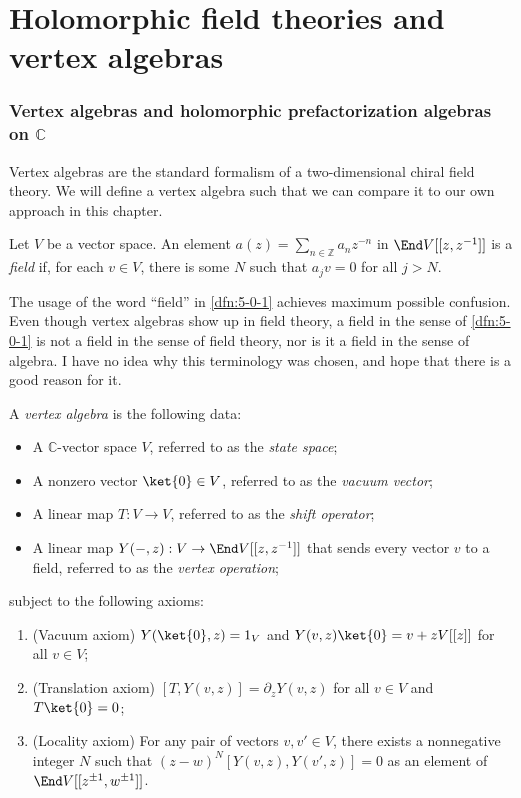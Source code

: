 \chapter{Holomorphic field theories and vertex algebras}


\subsection{Vertex algebras and holomorphic prefactorization algebras on $\mathbb{C} $}

Vertex algebras are the standard formalism of a two-dimensional chiral field theory. We will define a vertex algebra such that we can compare it to our own approach in this chapter.

\begin{definition}\label{dfn:5-0-1}
	Let $V$ be a vector space. An element $a(z) = \sum_{n\in\mathbb{Z} } a_nz^{-n} $ in $\End V[[z,z^{-1} ]]$ is a \emph{field} if, for each $v\in V$, there is some $N$ such that $a_jv=0$ for all $j>N$.
\end{definition}
\begin{warning}\label{warn:5-0-2}
	The usage of the word ``field'' in \cref{dfn:5-0-1} achieves maximum possible confusion. Even though vertex algebras show up in field theory, a field in the sense of \cref{dfn:5-0-1} is not a field in the sense of field theory, nor is it a field in the sense of algebra. I have no idea why this terminology was chosen, and hope that there is a good reason for it.
\end{warning}

\begin{definition}\label{dfn:5-0-3}
	A \emph{vertex algebra} is the following data:
	\begin{itemize}
		\item A $\mathbb{C} $-vector space $V$, referred to as the \emph{state space};
		\item A nonzero vector $\ket{0}\in V$, referred to as the \emph{vacuum vector};
		\item A linear map $T : V \to V$, referred to as the \emph{shift operator};
		\item A linear map $Y(-,z): V \to \End V[[z,z^{-1} ]]$ that sends every vector $v$ to a field, referred to as the \emph{vertex operation};
	\end{itemize}
	subject to the following axioms:
	\begin{enumerate}
		\item (Vacuum axiom) $Y(\ket{0},z)=1_V$ and $Y(v,z)\ket{0}=v+zV[[z]]$ for all $v\in V$;
		\item (Translation axiom) $[T,Y(v,z)] = \partial _zY(v,z)$ for all $v\in V$ and $T\ket{0}=0$;
		\item (Locality axiom) For any pair of vectors $v,v'\in V$, there exists a nonnegative integer $N$ such that $(z-w)^N[Y(v,z),Y(v',z)] = 0$ as an element of $\End V[[z^{\pm 1} ,w^{\pm 1} ]]$.
	\end{enumerate}
\end{definition}

